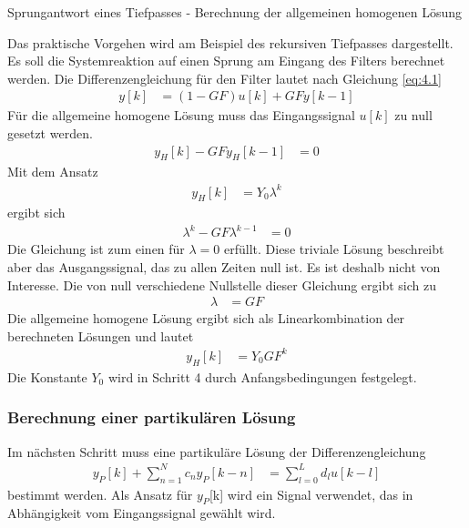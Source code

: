 \begin{example}{Sprungantwort eines Tiefpasses - Berechnung der allgemeinen homogenen Lösung}
\label{example:beispiel-sprungantwort-eines-tiefpasses---berechnung-der-allgemeinen-homogenen-luxf6sung}

Das praktische Vorgehen wird am Beispiel des rekursiven Tiefpasses dargestellt. Es soll die Systemreaktion auf einen Sprung am Eingang des Filters berechnet werden. Die Differenzengleichung für den Filter lautet nach Gleichung \eqref{eq:4.1}
\begin{align*}
y[ k] &= (1 - GF)  u[ k] + GF  y[ k - 1] 
\end{align*}
Für die allgemeine homogene Lösung muss das Eingangssignal \(u[k]\) zu null gesetzt werden.
\begin{align*}
y_{H}[ k] - GF  y_{H}[ k - 1] &= 0 
\end{align*}
Mit dem Ansatz
\begin{align*}
y_{H}[ k] &= Y_{0}  \lambda^{k} 
\end{align*}
ergibt sich
\begin{align*}
\lambda^{k} - GF  \lambda^{k - 1} &= 0 
\end{align*}
Die Gleichung ist zum einen für \(λ = 0\) erfüllt. Diese triviale Lösung beschreibt aber das Ausgangssignal, das zu allen Zeiten null ist. Es ist deshalb nicht von Interesse. Die von null verschiedene Nullstelle dieser Gleichung ergibt sich zu
\begin{align*}
\lambda &= GF 
\end{align*}
Die allgemeine homogene Lösung ergibt sich als Linearkombination der berechneten Lösungen und lautet
\begin{align*}
y_{H}[ k] &= Y_{0}  GF^{k} 
\end{align*}
Die Konstante \(Y_{0}\) wird in Schritt 4 durch Anfangsbedingungen festgelegt.

\end{example}

\subsubsection{Berechnung einer partikulären Lösung}\label{sec:berechnung-einer-partikuluxe4ren-luxf6sung}

Im nächsten Schritt muss eine partikuläre Lösung der Differenzengleichung
\begin{align}
y_{P}[ k] + \sum\limits_{n = 1}^{N}{c_{n}  y_{P}[ k - n]} &= \sum\limits_{l = 0}^{L}{d_{l}  u[ k - l]} \label{eq:4.59}
\end{align}
bestimmt werden. Als Ansatz für \(y_{P}\){[}k{]} wird ein Signal verwendet, das in Abhängigkeit vom Eingangssignal gewählt wird.

